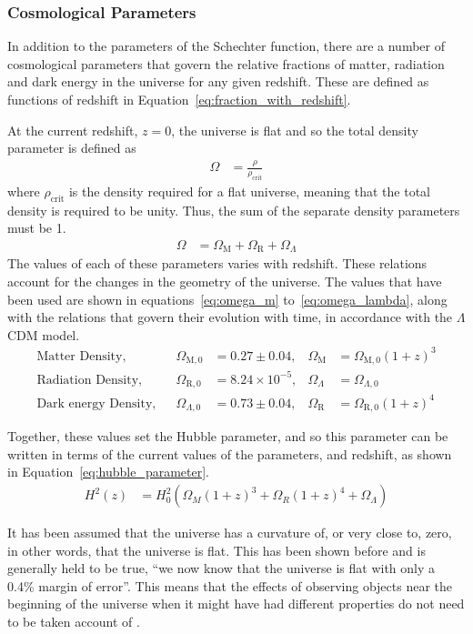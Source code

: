 	\subsubsection{Cosmological Parameters} %
	\label{ssub:cosmological_parameters}
		In addition to the parameters of the Schechter function, there are a number of cosmological parameters that govern the relative fractions of matter, radiation and dark energy in the universe for any given redshift. These are defined as functions of redshift in Equation~\ref{eq:fraction_with_redshift}.

		At the current redshift, $z=0$, the universe is flat and so the total density parameter is defined as
		\begin{align}
			\Omega &= \frac{\rho}{\rho_{\text{crit}}}
		\end{align}
		where $\rho_{\text{crit}}$ is the density required for a flat universe, meaning that the total density is required to be unity. Thus, the sum of the separate density parameters must be 1.
		\begin{align}
			\Omega &= \Omega_\text{M} + \Omega_\text{R} + \Omega_\Lambda \label{eq:fraction_with_redshift}
		\end{align}
		The values of each of these parameters varies with redshift. These relations account for the changes in the geometry of the universe. The values that have been used are shown in equations~\ref{eq:omega_m} to~\ref{eq:omega_lambda}, along with the relations that govern their evolution with time, in accordance with the $\Lambda$CDM model\cite{modern_astrophysics_bradley}.
		\begin{align}
			\text{Matter Density}, 		&& \Omega_{\text{M},0} 	&= 0.27\pm 0.04,			& \Omega_\text{M} &= \Omega_{\text{M},0}{(1+z)}^3 \label{eq:omega_m}\\
			\text{Radiation Density}, 	&& \Omega_{\text{R},0}	&= 8.24\times 10^{-5}, 	& \Omega_\Lambda  &= \Omega_{\Lambda,0} \label{eq:omega_r}\\
			\text{Dark energy Density}, 	&& \Omega_{\Lambda,0} 	&= 0.73\pm 0.04,			& \Omega_\text{R} &= \Omega_{\text{R},0}{(1+z)}^4 \label{eq:omega_lambda}
		\end{align}

		Together, these values set the Hubble parameter, and so this parameter can be written in terms of the current values of the parameters, and redshift, as shown in Equation~\ref{eq:hubble_parameter}\cite{hubble_parameter_astro_journal}.
		\begin{align}
	        H^2(z) &= H_0^2\left( \Omega_M {(1+z)}^3 + \Omega_R {(1+z)}^4 + \Omega_{\Lambda} \right) \label{eq:hubble_parameter}
    	\end{align}

    	It has been assumed that the universe has a curvature of, or very close to, zero\cite{1102.4485}, in other words, that the universe is flat. This has been shown before and is generally held to be true, ``we now know that the universe is flat with only a 0.4\% margin of error''\cite{nasa_uni_shape}. This means that the effects of observing objects near the beginning of the universe when it might have had different properties do not need to be taken account of .
